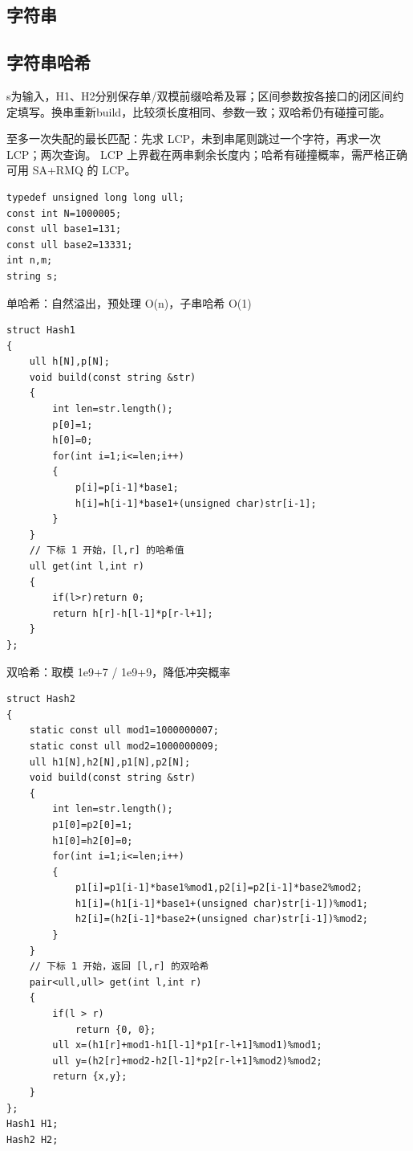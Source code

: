 \documentclass[UTF8,fontset=fandol,a4paper,twoside]{ctexart}
\newcommand{\note}[1]{{\fontsize{10}{12}\selectfont #1\par}}
\begin{document}
\begin{multicols}{2}
\section{字符串}
\subsection{字符串哈希}

\note{s为输入，H1、H2分别保存单/\allowbreak{}双模前缀哈希及幂；区间参数按各接口的闭区间约定填写。换串重新build，比较须长度相同、参数一致；双哈希仍有碰撞可能。}
\note{至多一次失配的最长匹配：先求 LCP，未到串尾则跳过一个字符，再求一次 LCP；两次查询。 LCP 上界截在两串剩余长度内；哈希有碰撞概率，需严格正确可用 SA+\allowbreak{}RMQ 的 LCP。}
\begin{lstlisting}
typedef unsigned long long ull;
const int N=1000005;
const ull base1=131;
const ull base2=13331;
int n,m;
string s;
\end{lstlisting}
\note{单哈希：自然溢出，预处理 O(\allowbreak{}n)\allowbreak{}，子串哈希 O(\allowbreak{}1)\allowbreak{}}
\begin{lstlisting}
struct Hash1
{
    ull h[N],p[N];
    void build(const string &str)
    {
        int len=str.length();
        p[0]=1;
        h[0]=0;
        for(int i=1;i<=len;i++)
        {
            p[i]=p[i-1]*base1;
            h[i]=h[i-1]*base1+(unsigned char)str[i-1];
        }
    }
    // 下标 1 开始，[l,r] 的哈希值
    ull get(int l,int r)
    {
        if(l>r)return 0;
        return h[r]-h[l-1]*p[r-l+1];
    }
};
\end{lstlisting}
\note{双哈希：取模 1e9+\allowbreak{}7 /\allowbreak{} 1e9+\allowbreak{}9，降低冲突概率}
\begin{lstlisting}
struct Hash2
{
    static const ull mod1=1000000007;
    static const ull mod2=1000000009;
    ull h1[N],h2[N],p1[N],p2[N];
    void build(const string &str)
    {
        int len=str.length();
        p1[0]=p2[0]=1;
        h1[0]=h2[0]=0;
        for(int i=1;i<=len;i++)
        {
            p1[i]=p1[i-1]*base1%mod1,p2[i]=p2[i-1]*base2%mod2;
            h1[i]=(h1[i-1]*base1+(unsigned char)str[i-1])%mod1;
            h2[i]=(h2[i-1]*base2+(unsigned char)str[i-1])%mod2;
        }
    }
    // 下标 1 开始，返回 [l,r] 的双哈希
    pair<ull,ull> get(int l,int r)
    {
        if(l > r)
            return {0, 0};
        ull x=(h1[r]+mod1-h1[l-1]*p1[r-l+1]%mod1)%mod1;
        ull y=(h2[r]+mod2-h2[l-1]*p2[r-l+1]%mod2)%mod2;
        return {x,y};
    }
};
Hash1 H1;
Hash2 H2;
\end{lstlisting}

\end{multicols}
\end{document}
